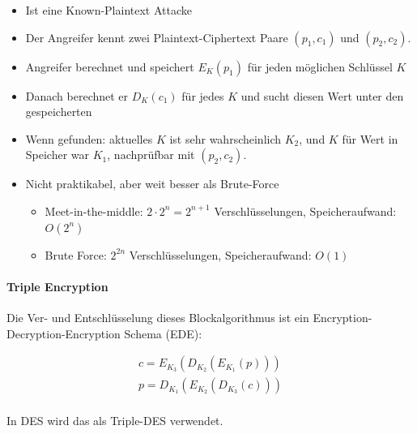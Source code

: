 \begin{itemize}
    \item Ist eine Known-Plaintext Attacke 
    \item Der Angreifer kennt zwei Plaintext-Ciphertext Paare $(p_1, c_1)$ und $(p_2, c_2)$.
    \item Angreifer berechnet und speichert $E_K(p_1)$ für jeden möglichen Schlüssel $K$
    \item Danach berechnet er $D_K(c_1)$ für jedes $K$ und sucht diesen Wert unter den gespeicherten
    \item Wenn gefunden: aktuelles $K$ ist sehr wahrscheinlich $K_2$, und $K$ für Wert in Speicher war $K_1$, nachprüfbar mit $(p_2, c_2)$.
    \item Nicht praktikabel, aber weit besser als Brute-Force
    \begin{itemize}
        \item Meet-in-the-middle: $2\cdot 2^n = 2^{n+1}$ Verschlüsselungen, Speicheraufwand: $O(2^n)$
        \item Brute Force: $2^{2n}$ Verschlüsselungen, Speicheraufwand: $O(1)$
    \end{itemize}
\end{itemize}

\paragraph{Triple Encryption}

Die Ver- und Entschlüsselung dieses Blockalgorithmus ist ein Encryption-Decryption-Encryption Schema (EDE):

\begin{align*}
    c = E_{K_3}\left( D_{K_2} \left( E_{K_1}(p) \right) \right) \\
    p = D_{K_1}\left( E_{K_2} \left( D_{K_3}(c) \right) \right) \\
\end{align*}

In DES wird das als Triple-DES verwendet.

